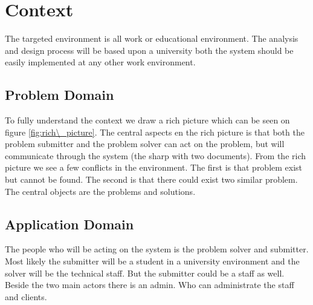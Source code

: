 \section{Context}
The targeted environment is all work or educational environment. The analysis and design process will be based upon a university both the system should be easily implemented at any other work environment. 

\subsection{Problem Domain}
To fully understand the context we draw a rich picture which can be seen on figure \ref{fig:rich\_picture}. The central aspects en the rich picture is that both the problem submitter and the problem solver can act on the problem, but will communicate through the system (the sharp with two documents). From the rich picture we see a few conflicts in the environment. The first is that problem exist but cannot be found. The second is that there could exist two similar problem. The central objects are the problems and solutions. 

\subsection{Application Domain}
The people who will be acting on the system is the problem solver and submitter. Most likely the submitter will be a student in a university environment and the solver will be the technical staff. But the submitter could be a staff as well. Beside the two main actors there is an admin. Who can administrate the staff and clients. 